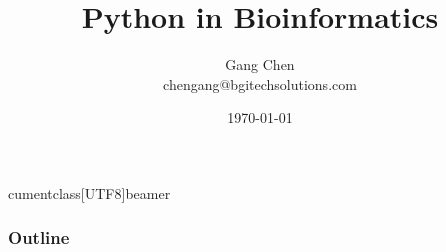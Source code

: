 cumentclass[UTF8]{beamer}
\usepackage{graphicx, color}
\usepackage{algorithm2e}
\usepackage{zhspacing}
\usepackage{amsmath}

\usepackage{underscore}
\usepackage{fontspec}
\setsansfont{Microsoft YaHei}

\usepackage{enumerate}



\title{Python in Bioinformatics}

\author{Gang Chen\\ chengang@bgitechsolutions.com}

\date{\today}






\begin{frame}
\titlepage
\end{frame}

\begin{frame}[t]\frametitle{Outline}
\tableofcontents[hideallsubsections]
\end{frame}



